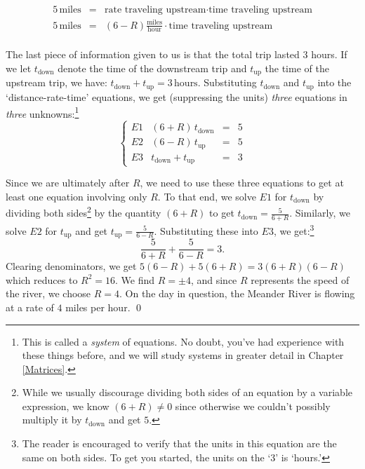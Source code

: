 \begin{ex}
 \[ \begin{array}{rcl}

5 \, \text{miles} & = & \text{rate traveling upstream} \cdot \text{time traveling upstream} \\ 

5 \, \text{miles} & = & (6 - R) \frac{\text{miles}}{\text{hour}} \cdot \text{time traveling upstream} \\ 	\end{array} \]
 
The last piece of information given to us is that the total trip lasted $3$ hours.  If we let $t_{\text{down}}$ denote the time of the downstream trip and $t_{\text{up}}$ the time of the upstream trip, we have:    $t_{\text{down}} + t_{\text{up}} = 3 \, \text{hours}$.  Substituting $t_{\text{down}}$ and $t_{\text{up}}$ into the `distance-rate-time' equations, we get (suppressing the units) \textit{three} equations in \textit{three} unknowns:\footnote{This is called a \textit{system} of equations.  No doubt, you've had experience with these things before, and we will study systems in greater detail in Chapter \ref{Matrices}.} \[\left\{\begin{array}{lrcl}   E1 & (6+R) \, t_{\text{down}} & = & 5 \\ E2 & (6-R) \, t_{\text{up}} & = & 5 \\ E3 & t_{\text{down}} + t_{\text{up}} & = & 3 \end{array} \right.\]

Since we are ultimately after $R$, we need to use these three equations to get at least one equation involving only $R$.  To that end, we solve $E1$ for $t_{\text{down}}$ by dividing both sides\footnote{While we usually discourage dividing both sides of an equation by a variable expression, we know $(6+R) \neq 0$ since otherwise we couldn't possibly multiply it by $t_{\text{down}}$ and get $5$.} by the quantity $(6+R)$ to get $t_{\text{down}} = \frac{5}{6+R}$.   Similarly, we solve $E2$ for $t_{\text{up}}$ and get $t_{\text{up}} = \frac{5}{6-R}$. Substituting these into $E3$, we get:\footnote{The reader is encouraged to verify that the units in this equation are the same on both sides.  To get you started, the units on the `3' is `hours.'} \[\dfrac{5}{6+R} + \dfrac{5}{6 - R} = 3.\] Clearing denominators, we get $5(6-R) + 5(6+R) = 3(6+R)(6-R)$ which reduces to  $R^2 = 16$.   We find $R = \pm 4$, and since $R$ represents the speed of the river, we choose $R = 4$.   On the day in question, the Meander River is flowing at a rate of $4$ miles per hour. \qed

\end{ex}

